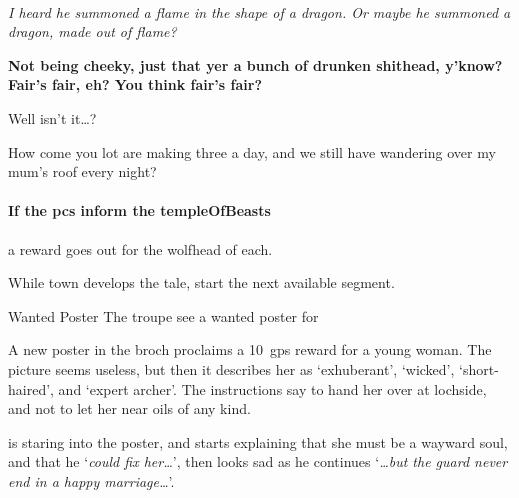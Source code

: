 \begin{speechtext}
  \\
  \par\noindent

  \slshape\large
  I heard he summoned a flame in the shape of a dragon.
  Or maybe he summoned a dragon, made out of flame?
  \par\small\normalfont
  \bfseries Not being cheeky, just that yer a bunch of drunken shithead, y'know?
  Fair's fair, eh?
  You think fair's fair?
  \par\scriptsize
  Well isn't it\ldots?
  \par\mdseries
  How come you lot are making three  a day, and we still have  wandering over my mum's roof every night?
\end{speechtext}

\paragraph{If the \glspl{pc} inform the \gls{templeOfBeasts}}
a reward goes out for the \gls{wolfhead} of  each.

While \gls{town} develops the tale, start the next available \gls{segment}.

{Wanted Poster}%
{The troupe see a wanted poster for }%

\begin{boxtext}
  A new poster in the \gls{broch} proclaims a 10~\glspl{gp} reward for a young woman.
  The picture seems useless, but then it describes her as `exhuberant', `wicked', `short-haired', and `expert archer'.
  The instructions say to hand her over at \gls{lochside}, and not to let her near oils of any kind.

   is staring into the poster, and starts explaining that she must be a wayward soul, and that he `\textit{could fix her\ldots}', then looks sad as he continues `\textit{\ldots but the \gls{guard} never end in a happy marriage\ldots}'.
\end{boxtext}

